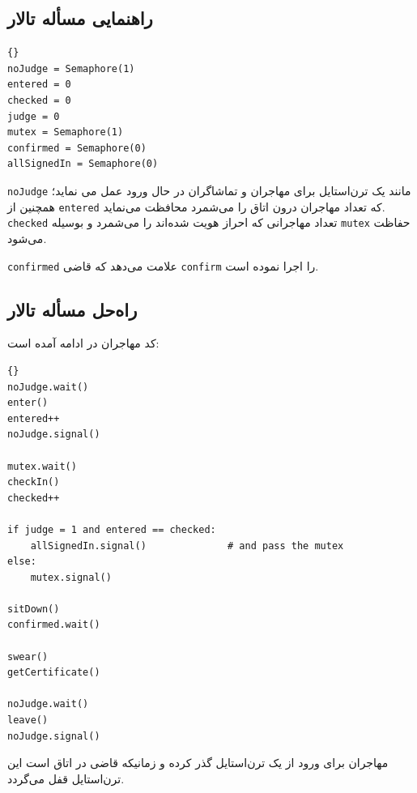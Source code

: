 \documentclass{book}
\newcommand{\clearemptydoublepage}{\newpage\cleardoublepage}
\begin{document}
\clearemptydoublepage
\subsection{راهنمایی مسأله تالار }

\begin{latin}
\begin{lstlisting}[title=\rl{راهنمایی مسأله تالار \lr{Faneuil}}]{}
noJudge = Semaphore(1)
entered = 0
checked = 0
judge = 0
mutex = Semaphore(1)
confirmed = Semaphore(0)
allSignedIn = Semaphore(0)
\end{lstlisting}
\end{latin}


    {\tt noJudge} 
    مانند یک ترن‌استایل برای مهاجران و تماشاگران در حال ورود عمل می نماید؛ همچنین از {\tt entered} که تعداد مهاجران درون اتاق را می‌شمرد 
    محافظت می‌نماید.  {\tt checked} تعداد مهاجرانی که احراز هویت شده‌اند را می‌شمرد و بوسیله {\tt mutex} حفاظت می‌شود. 

    {\tt confirmed}
    علامت می‌دهد که قاضی {\tt confirm} را اجرا نموده است. 

\clearemptydoublepage
\subsection{راه‌حل مسأله تالار }

    کد مهاجران در ادامه آمده است:

\begin{latin}
\begin{lstlisting}[title=\rl{راهنمایی مسأله تالار \lr{Faneuil} (مهاجر)}]{}
noJudge.wait()
enter()
entered++
noJudge.signal()

mutex.wait()
checkIn()
checked++

if judge = 1 and entered == checked:
    allSignedIn.signal()              # and pass the mutex
else:
    mutex.signal()

sitDown()
confirmed.wait()

swear()
getCertificate()

noJudge.wait()
leave()
noJudge.signal()
\end{lstlisting}
\end{latin}

    مهاجران برای ورود از یک ترن‌استایل گذر کرده و زمانیکه قاضی در اتاق است این ترن‌استایل قفل می‌گردد.
\end{document}
